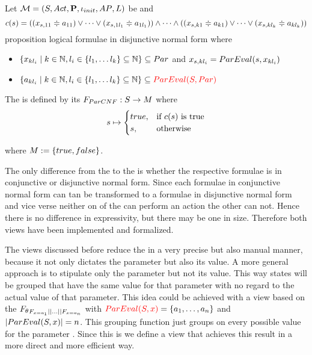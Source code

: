 \documentclass[preview]{standalone}
\begin{document}
\begin{definition}
	Let $\chgph = \chgphtuple$ be \chosengraphtypeN and 
	\[
	c(s) = ((\paramstate[,11] \eqorneq \paramval_{11}) \lor \dots \lor (\paramstate[,1l_1] \eqorneq \paramval_{1l_1})) \land \dots \land ((\paramstate[,k1] \eqorneq \paramval_{k1}) \lor \dots \lor (\paramstate[,kl_k]  \eqorneq \paramval_{kl_k}))
	\]
	proposition logical formulae in disjunctive normal form where
	\begin{itemize}
		\item $\{\param_{kl_i} \mid k \in \natnums, l_i \in \{l_1, \dots l_k\} \subseteq \natnums\} \subseteq \params$ and $\paramstate[,kl_i] = \parameval(\state, \param_{kl_i})$
		\item $\{\paramval_{kl_i} \mid k \in \natnums, l_i \in \{l_1, \dots l_k\} \subseteq \natnums\} \subseteq \redcomment{\parameval(\states,\params)}$
	\end{itemize}
	The \viewN \viewparamcnf is defined by its \grpfctN $\gfctparamcnf : \states \to \imggrp$ where
	\[
	\state \mapsto
	\begin{cases}
		true, &\text{if } c(s) \text{ is true}\\
		\remelem, 	&\text{otherwise}
	\end{cases}
	\]
	
	where $\imggrp := \{true, false\}$.
\end{definition}

The only difference from the \viewN \viewparamcnf to the \viewN \viewparamdnf is whether the respective formulae is in conjunctive or disjunctive normal form. Since each formulae in conjunctive normal form can tan be transformed to a formulae in disjunctive normal form and vice verse neither on of the \viewsN can perform an action the other can not. Hence there is no difference in expressivity, but there may be one in size. Therefore both views have been implemented and formalized. 

The views discussed before reduce the \chosengraphtypeN in a very precise but also manual manner, because it not only dictates the parameter but also its value. A more general approach is to stipulate only the parameter but not its value. This way states will be grouped that have the same value for that parameter with no regard to the actual value of that parameter. This idea could be achieved with a view based on the \grpfctN $\grpfct_{\gfctparamvalueseqopt[\paramval_1] \pll \dots \pll \gfctparamvalueseqopt[\paramval_n]}$ with $\redcomment{\parameval(\states, \param)} = \{\paramval_1, \dots, \paramval_n\}$ and $|\parameval(\states,\param)| = n$. This grouping function just groups on every possible value for the parameter \param. Since this is  we define a view that achieves this result in a more direct and more efficient way.
\end{document}

